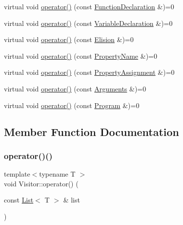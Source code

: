 \begin{DoxyCompactItemize}
virtual void \hyperlink{struct_visitor_aa4450ebee6fecf69499279c0768282f1}{operator()} (const \hyperlink{struct_function_declaration}{Function\+Declaration} \&)=0
\item 
virtual void \hyperlink{struct_visitor_a31c2d34895501d90193ec523c8acde05}{operator()} (const \hyperlink{struct_variable_declaration}{Variable\+Declaration} \&)=0
\item 
virtual void \hyperlink{struct_visitor_a87450ddc80e1522e8ef06cc7c168bad4}{operator()} (const \hyperlink{struct_elision}{Elision} \&)=0
\item 
virtual void \hyperlink{struct_visitor_a51d8b1d3dafa5d6a7d878673a2c4f9a8}{operator()} (const \hyperlink{struct_property_name}{Property\+Name} \&)=0
\item 
virtual void \hyperlink{struct_visitor_a698c9aa4b47188061f156fe58c148d55}{operator()} (const \hyperlink{struct_property_assignment}{Property\+Assignment} \&)=0
\item 
virtual void \hyperlink{struct_visitor_a73daac2b555cca03beaf9da73bf540c7}{operator()} (const \hyperlink{struct_arguments}{Arguments} \&)=0
\item 
virtual void \hyperlink{struct_visitor_a768e64f6e6fffb7440e3c1f1a78d9481}{operator()} (const \hyperlink{struct_program}{Program} \&)=0
\end{DoxyCompactItemize}


\subsection{Member Function Documentation}
\mbox{\label{struct_visitor_af54ab534ccb009ab5a129247bc38dd05}} 
\subsubsection{\texorpdfstring{operator()()}{operator()()}\hspace{0.1cm}{\footnotesize\ttfamily [1/45]}}
{\footnotesize\ttfamily template$<$typename T $>$ \\
void Visitor\+::operator() (\begin{DoxyParamCaption}\item[{const \hyperlink{struct_list}{List}$<$ T $>$ \&}]{list }\end{DoxyParamCaption})\hspace{0.3cm}{\ttfamily [inline]}}

